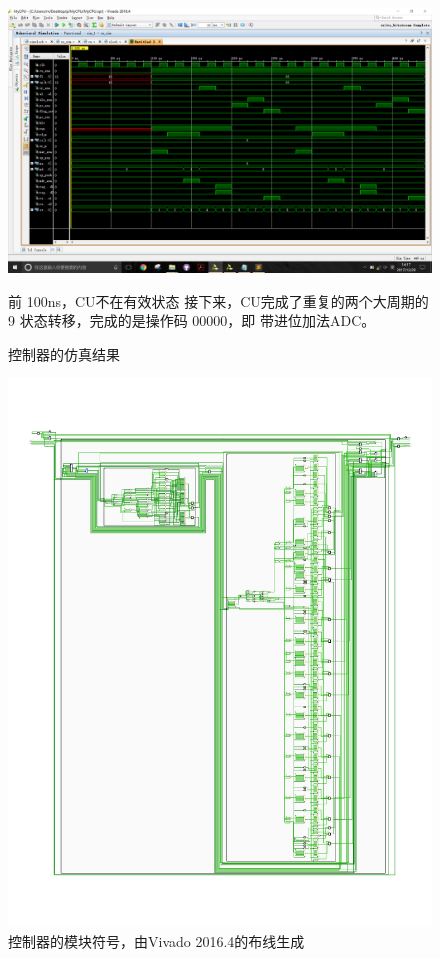 \documentclass[titlepage, 11pt]{article}
\begin{document}
		    \begin{figure}[H]
		    	\centering
		    	\includegraphics[scale=0.4]{cu.png}
		    	\caption{控制器的仿真结果}
		    	前 100ns，CU不在有效状态
		    	接下来，CU完成了重复的两个大周期的 9 状态转移，完成的是操作码 00000，即 带进位加法ADC。
		    \end{figure}
			\begin{figure}[H]
				\centering
				\includegraphics[scale=1]{29.pdf}
				\caption{控制器的模块符号，由Vivado 2016.4的布线生成}
			\end{figure}
\end{document}
